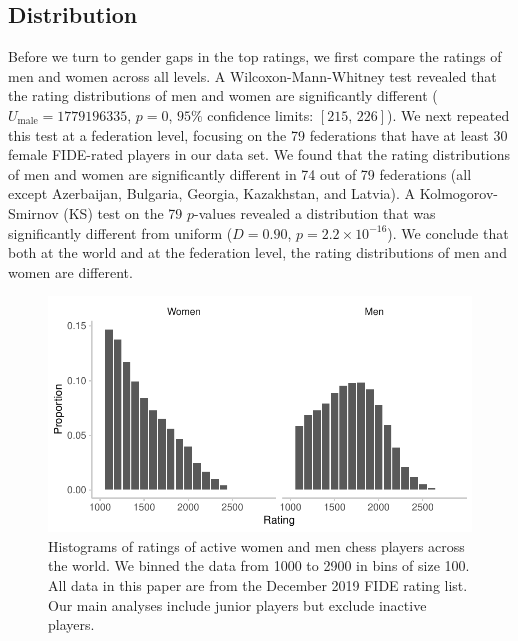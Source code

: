 \documentclass[9pt,twocolumn,twoside,lineno]{pnas-new}
\begin{document}
\subsection*{Distribution}
Before we turn to gender gaps in the top ratings, we first compare the ratings of men and women across all levels. A Wilcoxon-Mann-Whitney test revealed that the rating distributions of men and women are significantly different ($U_\mathrm{male} = 1779196335$, $p = 0$, $95\%$ confidence limits: $[215, \, 226]$). We next repeated this test at a federation level, focusing on the 79 federations that have at least 30 female FIDE-rated players in our data set. We found that the rating distributions of men and women are significantly different in 74 out of 79 federations (all except Azerbaijan, Bulgaria, Georgia, Kazakhstan, and Latvia). A Kolmogorov-Smirnov (KS) test on the 79 $p$-values revealed a distribution that was significantly different from uniform ($D = 0.90$, $p = 2.2 \times 10^{-16}$). We conclude that both at the world and at the federation level, the  rating distributions of men and women are different.

 \begin{figure}[!ht]
     \centering
     \includegraphics[width = \linewidth]{fig_1_w_jun_no_ina.pdf}
     \caption{Histograms of ratings of active women and men chess players across the world. We binned the data from 1000 to 2900 in bins of size 100. All data in this paper are from the December 2019 FIDE rating list. Our main analyses include junior players but exclude inactive players.}
     \label{fig:summ_stats}
 \end{figure}
\end{document}
